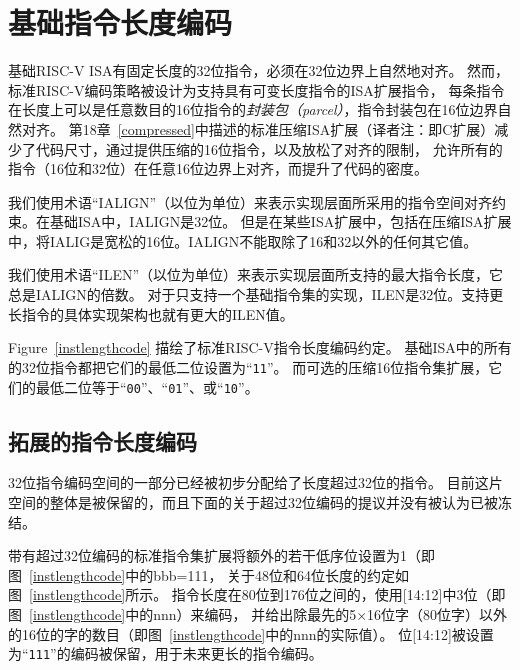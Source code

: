 \section{基础指令长度编码}

基础RISC-V ISA有固定长度的32位指令，必须在32位边界上自然地对齐。
然而，标准RISC-V编码策略被设计为支持具有可变长度指令的ISA扩展指令，
每条指令在长度上可以是任意数目的16位指令的{\em 封装包（parcel）}，指令封装包在16位边界自然对齐。
第18章~\ref{compressed}中描述的标准压缩ISA扩展（译者注：即C扩展）减少了代码尺寸，通过提供压缩的16位指令，以及放松了对齐的限制，
允许所有的指令（16位和32位）在任意16位边界上对齐，而提升了代码的密度。

我们使用术语“IALIGN”（以位为单位）来表示实现层面所采用的指令空间对齐约束。在基础ISA中，IALIGN是32位。
但是在某些ISA扩展中，包括在压缩ISA扩展中，将IALIG是宽松的16位。IALIGN不能取除了16和32以外的任何其它值。

我们使用术语“ILEN”（以位为单位）来表示实现层面所支持的最大指令长度，它总是IALIGN的倍数。
对于只支持一个基础指令集的实现，ILEN是32位。支持更长指令的具体实现架构也就有更大的ILEN值。

Figure~\ref{instlengthcode} 描绘了标准RISC-V指令长度编码约定。
基础ISA中的所有的32位指令都把它们的最低二位设置为“{\tt 11}”。
而可选的压缩16位指令集扩展，它们的最低二位等于“{\tt 00}”、“{\tt 01}”、或“{\tt 10}”。

\subsection*{拓展的指令长度编码}

32位指令编码空间的一部分已经被初步分配给了长度超过32位的指令。
目前这片空间的整体是被保留的，而且下面的关于超过32位编码的提议并没有被认为已被冻结。

带有超过32位编码的标准指令集扩展将额外的若干低序位设置为1（即图~\ref{instlengthcode}中的bbb=111，
关于48位和64位长度的约定如图~\ref{instlengthcode}所示。
指令长度在80位到176位之间的，使用[14:12]中3位（即图~\ref{instlengthcode}中的nnn）来编码，
并给出除最先的5$\times$16位字（80位字）以外的16位的字的数目（即图~\ref{instlengthcode}中的nnn的实际值）。
位[14:12]被设置为“{\tt 111}”的编码被保留，用于未来更长的指令编码。


